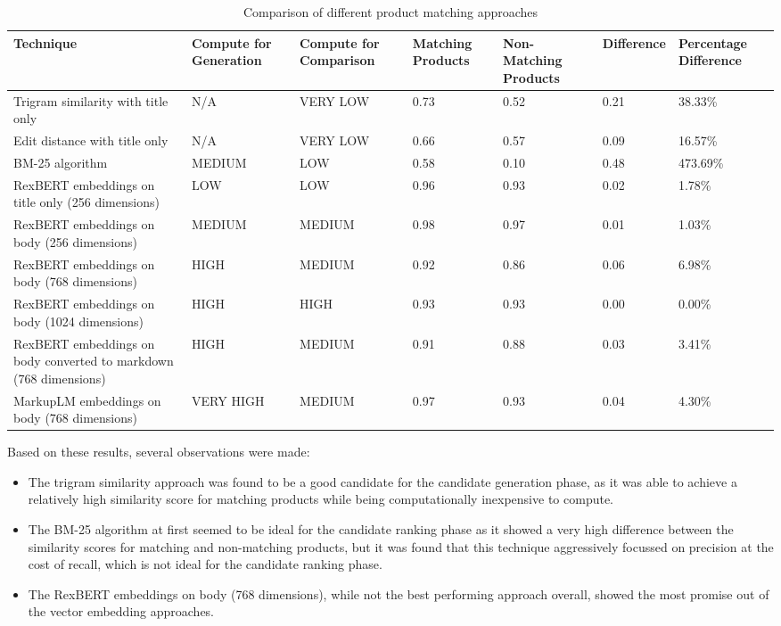 \begin{table}[h]
    \centering
    \small
    \renewcommand{\arraystretch}{1.4}
    \begin{tabularx}{\textwidth}{p{3.5cm} p{1.4cm} p{1.4cm} p{1.9cm} p{1.9cm} p{1.5cm} p{1.5cm}}
        \toprule
        \textbf{Technique} & \textbf{Compute for Generation} & \textbf{Compute for Comparison} & \textbf{Matching Products} & \textbf{Non-Matching Products} & \textbf{Difference} & \textbf{Percentage Difference} \\
        \midrule
        Trigram similarity with title only & N/A & VERY LOW & 0.73 & 0.52 & 0.21 & 38.33\% \\
        \midrule
        Edit distance with title only & N/A & VERY LOW & 0.66 & 0.57 & 0.09 & 16.57\% \\
        \midrule
        BM-25 algorithm & MEDIUM & LOW & 0.58 & 0.10 & 0.48 & 473.69\% \\
        \midrule
        RexBERT embeddings on title only (256 dimensions) & LOW & LOW & 0.96 & 0.93 & 0.02 & 1.78\% \\
        \midrule
        RexBERT embeddings on body (256 dimensions) & MEDIUM & MEDIUM & 0.98 & 0.97 & 0.01 & 1.03\% \\
        \midrule
        RexBERT embeddings on body (768 dimensions) & HIGH & MEDIUM & 0.92 & 0.86 & 0.06 & 6.98\% \\
        \midrule
        RexBERT embeddings on body (1024 dimensions) & HIGH & HIGH & 0.93 & 0.93 & 0.00 & 0.00\% \\
        \midrule
        RexBERT embeddings on body converted to markdown (768 dimensions) & HIGH & MEDIUM & 0.91 & 0.88 & 0.03 & 3.41\% \\
        \midrule
        MarkupLM embeddings on body (768 dimensions) & VERY HIGH & MEDIUM & 0.97 & 0.93 & 0.04 & 4.30\% \\
        \bottomrule
    \end{tabularx}
    \caption{Comparison of different product matching approaches}
    \label{tab:product_matching_approaches}
\end{table}

Based on these results, several observations were made:
\begin{itemize}
    \item The trigram similarity approach was found to be a good candidate for the candidate generation phase, as it was able to achieve a relatively high similarity score for matching products while being computationally inexpensive to compute.
    \item The BM-25 algorithm at first seemed to be ideal for the candidate ranking phase as it showed a very high difference between the similarity scores for matching and non-matching products, but it was found that this technique aggressively focussed on precision at the cost of recall, which is not ideal for the candidate ranking phase.
    \item The RexBERT embeddings on body (768 dimensions), while not the best performing approach overall, showed the most promise out of the vector embedding approaches.
\end{itemize}

